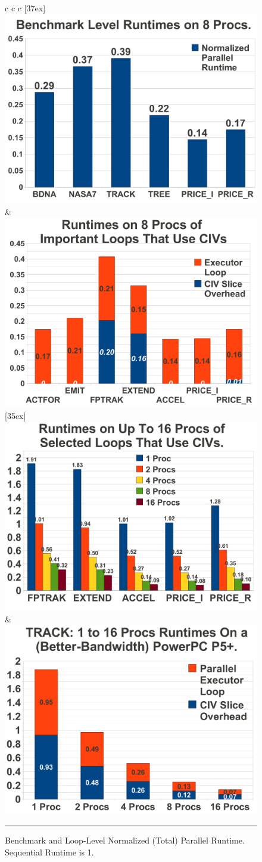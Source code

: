 \documentclass{sig-alternate}
\begin{document}
\begin{figure}[t]
	\begin{tabular}{c c c} 
	[37ex]
	{      		%
                \includegraphics[width=.40\textwidth]{Figures/EmpRes/BenchParRes}\vspace{2ex}
	} & { \hspace{-55ex}
                    \includegraphics[width=.40\textwidth]{Figures/EmpRes/LoopParRes} \vspace{2ex}
	} \\ 
	[35ex]
	{           
                \includegraphics[width=.40\textwidth]{Figures/EmpRes/LoopScalRes}
	} & { \hspace{16ex}
                \includegraphics[width=.40\textwidth]{Figures/EmpRes/TrackScal}
	}
\end{tabular} 
\hrule
\caption{ Benchmark and Loop-Level Normalized (Total) Parallel Runtime. Sequential Runtime is 1.}
\label{fig:ParRuntime} %
\end{figure}
\end{document}
